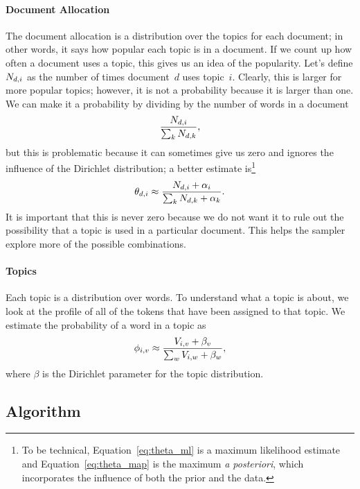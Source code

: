 \paragraph{Document Allocation} The document allocation is a distribution over
the topics for each document; in other words, it says how popular each topic is
in a document.  If we count up how often a document uses a topic, this gives us
an idea of the popularity.  Let's define $N_{d,i}$ as the number of times
document~$d$ uses topic~$i$.  Clearly, this is larger for more popular topics;
however, it is not a probability because it is larger than one.  We can make it a
probability by dividing by the number of words in a document
\begin{equation}
\frac{N_{d,i}}{\sum_k N_{d,k}},
\label{eq:theta_ml}
\end{equation}
but this is problematic because it can sometimes give us zero and ignores the
influence of the Dirichlet distribution; a better estimate is\footnote{To be
  technical, Equation~\ref{eq:theta_ml} is a maximum likelihood estimate and
  Equation~\ref{eq:theta_map} is the maximum \textit{a posteriori}, which
  incorporates the influence of both the prior and the data.}
\begin{equation}
\theta_{d,i} \approx \frac{N_{d,i} + \alpha_i}{\sum_k N_{d,k} + \alpha_k}.
\label{eq:theta_map}
\end{equation}
It is important that this is never zero because we do not want it to rule out the possibility
that a topic is used in a particular document.  This helps the sampler
explore more of the possible combinations.

\paragraph{Topics}

Each topic is a distribution over words.  To understand what a topic is about,
we look at the profile of all of the tokens that have been assigned to that
topic.  We estimate the probability of a word in a topic as
\begin{equation}
\phi_{i,v} \approx \frac{V_{i,v} + \beta_v}{\sum_w V_{i,w} + \beta_w},
\label{eq:phi_map}
\end{equation}
where $\beta$ is the Dirichlet parameter for the topic distribution.

\subsection{Algorithm}


